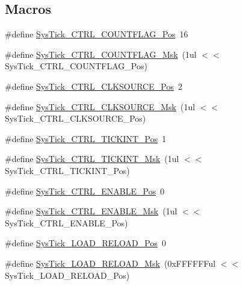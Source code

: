 \subsection*{Macros}
\begin{DoxyCompactItemize}
\item 
\#define \hyperlink{group___c_m_s_i_s___c_m3___sys_tick_gadbb65d4a815759649db41df216ed4d60}{Sys\-Tick\-\_\-\-C\-T\-R\-L\-\_\-\-C\-O\-U\-N\-T\-F\-L\-A\-G\-\_\-\-Pos}~16
\item 
\#define \hyperlink{group___c_m_s_i_s___c_m3___sys_tick_ga1bf3033ecccf200f59baefe15dbb367c}{Sys\-Tick\-\_\-\-C\-T\-R\-L\-\_\-\-C\-O\-U\-N\-T\-F\-L\-A\-G\-\_\-\-Msk}~(1ul $<$$<$ Sys\-Tick\-\_\-\-C\-T\-R\-L\-\_\-\-C\-O\-U\-N\-T\-F\-L\-A\-G\-\_\-\-Pos)
\item 
\#define \hyperlink{group___c_m_s_i_s___c_m3___sys_tick_ga24fbc69a5f0b78d67fda2300257baff1}{Sys\-Tick\-\_\-\-C\-T\-R\-L\-\_\-\-C\-L\-K\-S\-O\-U\-R\-C\-E\-\_\-\-Pos}~2
\item 
\#define \hyperlink{group___c_m_s_i_s___c_m3___sys_tick_gaa41d06039797423a46596bd313d57373}{Sys\-Tick\-\_\-\-C\-T\-R\-L\-\_\-\-C\-L\-K\-S\-O\-U\-R\-C\-E\-\_\-\-Msk}~(1ul $<$$<$ Sys\-Tick\-\_\-\-C\-T\-R\-L\-\_\-\-C\-L\-K\-S\-O\-U\-R\-C\-E\-\_\-\-Pos)
\item 
\#define \hyperlink{group___c_m_s_i_s___c_m3___sys_tick_ga88f45bbb89ce8df3cd2b2613c7b48214}{Sys\-Tick\-\_\-\-C\-T\-R\-L\-\_\-\-T\-I\-C\-K\-I\-N\-T\-\_\-\-Pos}~1
\item 
\#define \hyperlink{group___c_m_s_i_s___c_m3___sys_tick_ga95bb984266ca764024836a870238a027}{Sys\-Tick\-\_\-\-C\-T\-R\-L\-\_\-\-T\-I\-C\-K\-I\-N\-T\-\_\-\-Msk}~(1ul $<$$<$ Sys\-Tick\-\_\-\-C\-T\-R\-L\-\_\-\-T\-I\-C\-K\-I\-N\-T\-\_\-\-Pos)
\item 
\#define \hyperlink{group___c_m_s_i_s___c_m3___sys_tick_ga0b48cc1e36d92a92e4bf632890314810}{Sys\-Tick\-\_\-\-C\-T\-R\-L\-\_\-\-E\-N\-A\-B\-L\-E\-\_\-\-Pos}~0
\item 
\#define \hyperlink{group___c_m_s_i_s___c_m3___sys_tick_ga16c9fee0ed0235524bdeb38af328fd1f}{Sys\-Tick\-\_\-\-C\-T\-R\-L\-\_\-\-E\-N\-A\-B\-L\-E\-\_\-\-Msk}~(1ul $<$$<$ Sys\-Tick\-\_\-\-C\-T\-R\-L\-\_\-\-E\-N\-A\-B\-L\-E\-\_\-\-Pos)
\item 
\#define \hyperlink{group___c_m_s_i_s___c_m3___sys_tick_gaf44d10df359dc5bf5752b0894ae3bad2}{Sys\-Tick\-\_\-\-L\-O\-A\-D\-\_\-\-R\-E\-L\-O\-A\-D\-\_\-\-Pos}~0
\item 
\#define \hyperlink{group___c_m_s_i_s___c_m3___sys_tick_ga265912a7962f0e1abd170336e579b1b1}{Sys\-Tick\-\_\-\-L\-O\-A\-D\-\_\-\-R\-E\-L\-O\-A\-D\-\_\-\-Msk}~(0x\-F\-F\-F\-F\-F\-Ful $<$$<$ Sys\-Tick\-\_\-\-L\-O\-A\-D\-\_\-\-R\-E\-L\-O\-A\-D\-\_\-\-Pos)
$$
\end{DoxyCompactItemize}
